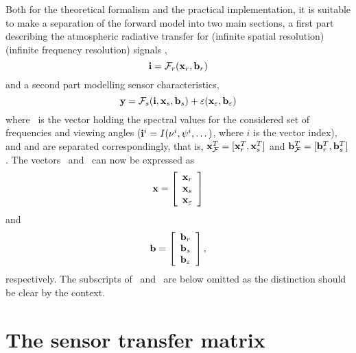  Both for the theoretical formalism and the practical implementation,
 it is suitable to make a separation of the forward model into two
 main sections, a first part describing the atmospheric radiative
 transfer for  (infinite spatial resolution)
  (infinite frequency resolution) signals
 \citep{eriksson:99},
 \begin{equation}
   \mathbf{i} = \mathcal{F}_r(\mathbf{x}_{r},\mathbf{b}_{r})
  \label{eq:formalism:fma}
 \end{equation}
 and a second part modelling sensor characteristics,
 \begin{equation}
   \mathbf{y} = \mathcal{F}_s(\mathbf{i},\mathbf{x}_{s},\mathbf{b}_{s}) + 
                       \varepsilon(\mathbf{x}_{\varepsilon},\mathbf{b}_{\varepsilon})
  \label{eq:formalism:fms}
 \end{equation}
 where \MpiVct\ is the vector holding the spectral values for the
 considered set of frequencies and viewing angles
 ($\mathbf{i}^i=I(\nu^i,\psi^i,\dots)$, where $i$ is the vector
 index), and \aSttVct{\FrwMdl} and \aFrwMdlVct{\FrwMdl} are separated
 correspondingly, that is, $\mathbf{x}_{\mathcal{F}}^T=
 [\mathbf{x}_{r}^T,\mathbf{x}_{s}^T]$ and $\mathbf{b}_{\mathcal{F}}^T=
 [\mathbf{b}_{r}^T,\mathbf{b}_{s}^T]$.  The vectors \SttVct\ and
 \FrwMdlVct\ can now be expressed as
 \begin{equation}
   \mathbf{x} = \left[ \begin{array}{c} \mathbf{x}_{r} \\ \mathbf{x}_{s} \\ 
                                       \mathbf{x}_{\varepsilon} \end{array} \right]
 \end{equation}
 and
 \begin{equation}
   \mathbf{b} = \left[ \begin{array}{c} \mathbf{b}_{r}\\ \mathbf{b}_{s} \\ 
                                    \mathbf{b}_{\varepsilon} \end{array}\right],
 \end{equation}
 respectively. The subscripts of \SttVct\ and \FrwMdlVct\ are below
 omitted as the distinction should be clear by the context.



\section{The sensor transfer matrix} 
 \label{sec:formalism:sensor}
  
